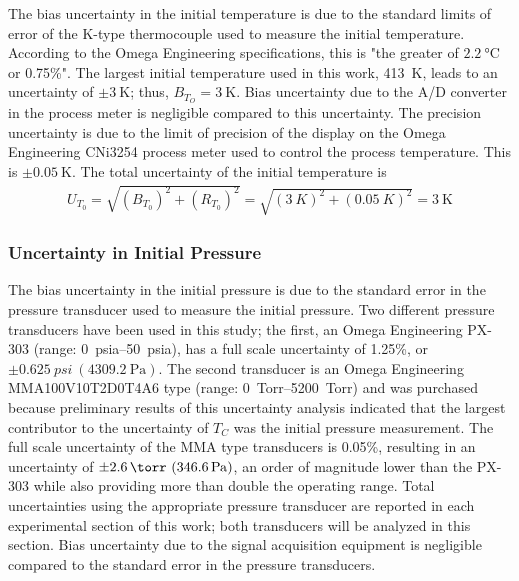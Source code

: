 \documentclass[12pt, letterpaper]{article}
\begin{document}
The bias uncertainty in the initial temperature is due to the standard
limits of error of the K-type thermocouple used to measure the
initial temperature. According to the Omega Engineering
specifications, this is "the greater
of $\SI{2.2}{\degreeCelsius}$ or 0.75\%". The largest initial temperature
used in this work, \SI{413}{\kelvin}, leads to an uncertainty of
$\pm \SI{3}{\kelvin}$; thus, $B_{T_O}=\SI{3}{\kelvin}$. Bias uncertainty
due to the A/D converter in the process meter is negligible compared
to this uncertainty.
The precision uncertainty is due to the limit of precision of
the display on the Omega Engineering CNi3254 process meter used
to control the process temperature. This is $\pm\SI{0.05}{\kelvin}$.
The total uncertainty of the initial temperature is
%
\begin{align}
U_{T_0} = \sqrt{\left(B_{T_0}\right)^2 + \left(R_{T_0}\right)^2} = \sqrt{\left(\SI{3}{K}\right)^2 + \left(\SI{0.05}{K}\right)^2} = \SI{3}{\kelvin}
\end{align}

\subsubsection{Uncertainty in Initial Pressure}
\label{sec:unc-p0}

The bias uncertainty in the initial pressure is due to the
standard error in the pressure transducer used to measure
the initial pressure. Two different pressure transducers have
been used in this study; the first, an Omega Engineering PX-303
(range: \SIrange{0}{50}{psia}), has a full scale uncertainty of 1.25\%, or
$\pm \SI{0.625}{psi} \ (\SI{4309.2}{\pascal})$. The second transducer is an
Omega Engineering MMA100V10T2D0T4A6 type (range: \SIrange{0}{5200}{Torr}) and was
purchased because preliminary results of this uncertainty analysis
indicated that the largest contributor to the uncertainty of $T_C$ was
the initial pressure measurement. The full scale uncertainty of the MMA
type transducers is 0.05\%, resulting in an uncertainty of
$\pm \SI{2.6}{\torr} \ (\SI{346.6}{\pascal})$, an order of magnitude lower than
the PX-303 while also providing more than double the operating range. Total
uncertainties using the appropriate pressure transducer are reported in
each experimental section of this work; both transducers will be analyzed
in this section. Bias uncertainty due to the signal acquisition equipment
is negligible compared to the standard error in the pressure transducers.
\end{document}
